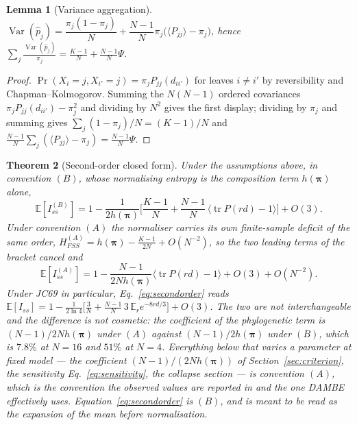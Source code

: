 \documentclass[11pt]{article}
\newcommand{\Iss}{I_{ss}}
\newcommand{\HFSS}{H_{FSS}}
\newcommand{\bpi}{\boldsymbol{\pi}}
\newcommand{\tr}{\operatorname{tr}}
\newcommand{\E}{\mathbb{E}}
\newcommand{\Var}{\operatorname{Var}}
\newtheorem{theorem}{Theorem}
\newtheorem{lemma}[theorem]{Lemma}
\theoremstyle{definition}
\theoremstyle{remark}
\begin{document}
\begin{lemma}[Variance aggregation]
\label{lem:varagg}
$\Var(\hat p_j)=\dfrac{\pi_j(1-\pi_j)}{N}+\dfrac{N-1}{N}\pi_j
\bigl(\langle P_{jj}\rangle-\pi_j\bigr)$, hence
$\displaystyle\sum_j\frac{\Var(\hat p_j)}{\pi_j}
=\frac{K-1}{N}+\frac{N-1}{N}\Psi .$
\end{lemma}

\begin{proof}
$\Pr(X_i=j,X_{i'}=j)=\pi_jP_{jj}(d_{ii'})$ for leaves $i\ne i'$ by
reversibility and Chapman--Kolmogorov. Summing the $N(N-1)$ ordered
covariances $\pi_jP_{jj}(d_{ii'})-\pi_j^2$ and dividing by $N^2$ gives the
first display; dividing by $\pi_j$ and summing gives
$\sum_j(1-\pi_j)/N=(K-1)/N$ and
$\frac{N-1}{N}\sum_j(\langle P_{jj}\rangle-\pi_j)=\frac{N-1}{N}\Psi$.
\end{proof}

\begin{theorem}[Second-order closed form]
\label{thm:secondorder}
Under the assumptions above, in convention $(B)$, whose normalising entropy
is the composition term $h(\bpi)$ alone,
\begin{equation}
  \E[\Iss^{(B)}]=1-\frac{1}{2h(\bpi)}\biggl[\frac{K-1}{N}
  +\frac{N-1}{N}\,\bigl\langle\tr P(rd)-1\bigr\rangle\biggr]+O(3).
  \label{eq:secondorder}
\end{equation}
Under convention $(A)$ the normaliser carries its own finite-sample deficit
of the same order, $\HFSS^{(A)}=h(\bpi)-\frac{K-1}{2N}+O(N^{-2})$, so the two
leading terms of the bracket cancel and
\begin{equation}
  \E[\Iss^{(A)}]=1-\frac{N-1}{2Nh(\bpi)}\bigl\langle\tr P(rd)-1\bigr\rangle
  +O(3)+O(N^{-2}).
  \label{eq:secondorderA}
\end{equation}
Under JC69 in particular, Eq.~\eqref{eq:secondorder} reads
$\E[\Iss]=1-\frac{1}{2\ln4}\bigl[\frac3N+\frac{N-1}{N}\,3\,\E_r e^{-8rd/3}\bigr]+O(3)$.
The two are not interchangeable and the difference is not cosmetic: the
coefficient of the phylogenetic term is $(N-1)/2Nh(\bpi)$ under $(A)$ against
$(N-1)/2h(\bpi)$ under $(B)$, which is $7.8\%$ at $N=16$ and $51\%$ at $N=4$.
Everything below that varies a parameter at fixed model --- the coefficient
$(N-1)/(2Nh(\bpi))$ of Section~\ref{sec:criterion}, the sensitivity
Eq.~\eqref{eq:sensitivity}, the collapse section --- is convention $(A)$,
which is the convention the observed values are reported in and the one
DAMBE effectively uses. Equation~\eqref{eq:secondorder} is $(B)$, and is
meant to be read as the expansion of the mean before normalisation.
\end{theorem}
\end{document}
